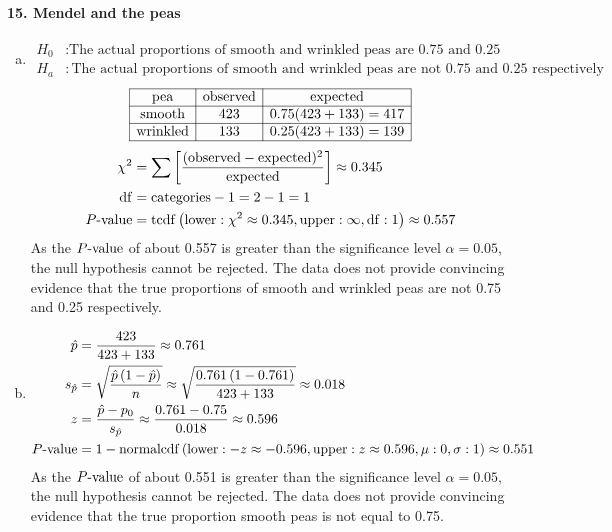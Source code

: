 \documentclass[../Homework]{subfiles}
\begin{document}
		\paragraph{15. Mendel and the peas}
			\begin{enumerate}[a.]
				\item
					\begin{align*}
						H_0&: \text{The actual proportions of smooth and wrinkled peas are 0.75 and 0.25 respectively.} \\
						H_a&: \text{The actual proportions of smooth and wrinkled peas are not \(0.75\) and \(0.25\) respectively}
					\end{align*}
					\[\begin{array}{|c|c|c|}\hline
						\text{pea} & \text{observed} & \text{expected} \\\hline
						\text{smooth} & 423 & 0.75(423 + 133) = 417 \\\hline
						\text{wrinkled} & 133 & 0.25(423 + 133) = 139 \\\hline
					\end{array}\]
					\begin{align*}
						\chi^2 &= \sum\left[\mathrm{\frac{(observed - expected)^2}{expected}}\right] \approx 0.345 \\
						\operatorname{df} &= \text{categories} - 1 = 2 - 1 = 1 \\
						P\text{-value} &= \operatorname{tcdf}\left(\operatorname{lower}: \chi^2 \approx 0.345, \operatorname{upper}: \infty, \operatorname{df}: 1\right) \approx 0.557
					\end{align*}
					As the $P\text{-value}$ of about 0.557 is greater than the significance level $\alpha = 0.05$, the null hypothesis cannot be rejected. The data does not provide convincing evidence that the true proportions of smooth and wrinkled peas are not 0.75 and 0.25 respectively.
				\item
					\begin{align*}
						\hat{p} &= \frac{423}{423 + 133} \approx 0.761 \\
						s_{\hat{p}} &= \sqrt{\frac{\hat{p}\left(1 - \hat{p}\right)}{n}} \approx \sqrt{\frac{0.761\left(1 - 0.761\right)}{423 + 133}} \approx 0.018 \\ 
						z &= \frac{\hat{p} - p_0}{s_{\hat{p}}} \approx \frac{0.761 - 0.75}{0.018} \approx 0.596 \\
						P\text{-value} &= 1 - \operatorname{normalcdf}\left(\operatorname{lower}: -z \approx -0.596, \operatorname{upper}: z \approx 0.596, \mu: 0, \sigma: 1\right) \approx 0.551
					\end{align*}
					As the $P\text{-value}$ of about 0.551 is greater than the significance level $\alpha = 0.05$, the null hypothesis cannot be rejected. The data does not provide convincing evidence that the true proportion smooth peas is not equal to 0.75.
			\end{enumerate}
\end{document}
